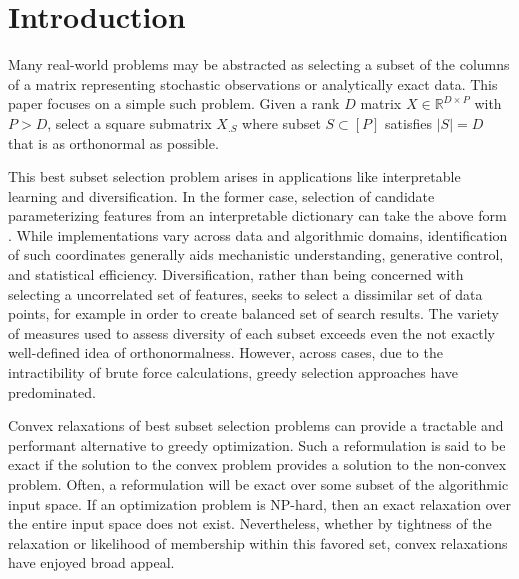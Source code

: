 \section{Introduction}
\label{sec:introduction}

Many real-world problems may be abstracted as selecting a subset of the columns of a matrix representing stochastic observations or analytically exact data.
This paper focuses on a simple such problem.
Given a rank $D$ matrix $ X \in \mathbb R^{D \times P}$ with $P > D$, select a square submatrix $ X_{. S}$ where subset $ S \subset [P]$ satisfies $| S| = D$ that is as orthonormal as possible.

This best subset selection problem arises in applications like interpretable learning and diversification.
In the former case, selection of candidate parameterizing features from an interpretable dictionary can take the above form \citep{5895106, NEURIPS2019_6a10bbd4, Kohli2021-lr, Jones2007-uc}.
While implementations vary across data and algorithmic domains, identification of such coordinates generally aids mechanistic understanding, generative control, and statistical efficiency.
Diversification, rather than being concerned with selecting a uncorrelated set of features, seeks to select a dissimilar set of data points, for example in order to create balanced set of search results.
The variety of measures used to assess diversity of each subset exceeds even the not exactly well-defined idea of orthonormalness.
However, across cases, due to the intractibility of brute force calculations, greedy selection approaches have predominated.


Convex relaxations of best subset selection problems can provide a tractable and performant alternative to greedy optimization. 
Such a reformulation is said to be exact if the solution to the convex problem provides a solution to the non-convex problem.
Often, a reformulation will be exact over some subset of the algorithmic input space.
If an optimization problem is NP-hard, then an exact relaxation over the entire input space does not exist.
Nevertheless, whether by tightness of the relaxation or likelihood of membership within this favored set, convex relaxations have enjoyed broad appeal.

